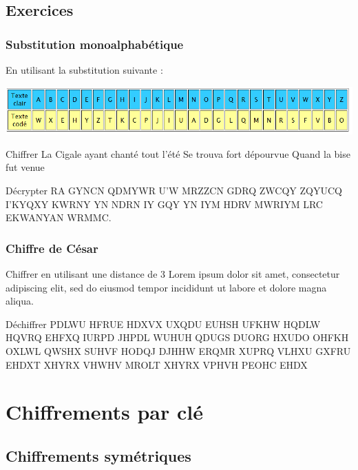 \documentclass[xcolor={dvipsnames}]{beamer}
\begin{document}
\subsection{Exercices}
\begin{frame}
	\frametitle{Substitution monoalphabétique}	
	
	En utilisant la substitution suivante :
	\begin{center}
		\includegraphics[scale=0.65]{subst}
	\end{center}
	
	\begin{block}{Chiffrer}
		La Cigale ayant chanté tout l'été
		Se trouva fort dépourvue
		Quand la bise fut venue
	\end{block}
	
	\begin{block}{Décrypter}
		RA GYNCN QDMYWR U'W MRZZCN GDRQ ZWCQY ZQYUCQ I'KYQXY KWRNY YN NDRN IY GQY YN IYM HDRV MWRIYM LRC EKWANYAN WRMMC.
	\end{block}
\end{frame}

\begin{frame}
	\frametitle{Chiffre de César}	
	
	\begin{block}{Chiffrer en utilisant une distance de 3}
		Lorem ipsum dolor sit amet, consectetur adipiscing elit, sed do eiusmod tempor incididunt ut labore et dolore magna aliqua. 
	\end{block}
	
	\begin{block}{Déchiffrer}
		PDLWU HFRUE HDXVX UXQDU EUHSH UFKHW HQDLW HQVRQ EHFXQ IURPD JHPDL WUHUH QDUGS DUORG HXUDO OHFKH OXLWL QWSHX SUHVF HODQJ DJHHW ERQMR XUPRQ VLHXU GXFRU EHDXT XHYRX VHWHV MROLT XHYRX VPHVH PEOHC EHDX
	\end{block}
\end{frame}

\section{Chiffrements par clé}

\subsection{Chiffrements symétriques}
\end{document}
